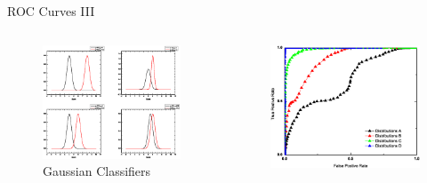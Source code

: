 \begin{frame}{ROC Curves III}
\begin{columns}[onlytextwidth]
\begin{column}{0.45\textwidth}
	\begin{figure}
		\centering
		\includegraphics[height=\textwidth]{images/ROC_GaussDist.eps}
		\caption{Gaussian Classifiers}
		\label{fig:ROCGausClassifers}
	\end{figure}
\end{column}
\begin{column}{0.45\textwidth}
	\begin{figure}
		\centering
		\includegraphics[height=\textwidth]{images/ROC_Gaussian.eps}

\end{figure}
\end{column}
\end{columns}
\end{frame}
